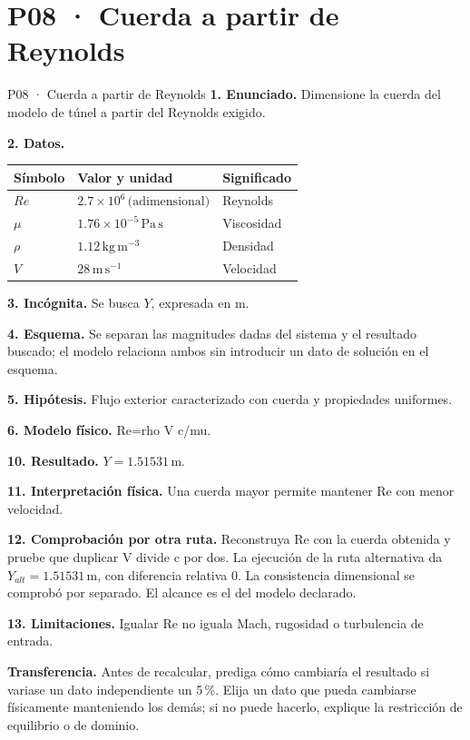 \chapter*{P08 · Cuerda a partir de Reynolds}
\begin{studiumworked}{P08 · Cuerda a partir de Reynolds}
\textbf{1. Enunciado.} Dimensione la cuerda del modelo de túnel a partir del Reynolds exigido.

\textbf{2. Datos.}
\begin{longtable}{p{.16\linewidth}p{.35\linewidth}p{.38\linewidth}}\toprule Símbolo & Valor y unidad & Significado\\\midrule\endhead
$Re$ & $2.7\times10^{6}\,\text{(adimensional)}$ & Reynolds\\
$\mu$ & $1.76\times10^{-5}\,\mathrm{Pa\,s}$ & Viscosidad\\
$\rho$ & $1.12\,\mathrm{kg\,m^{-3}}$ & Densidad\\
$V$ & $28\,\mathrm{m\,s^{-1}}$ & Velocidad\\
\bottomrule\end{longtable}
\textbf{3. Incógnita.} Se busca $Y$, expresada en $\mathrm m$.

\textbf{4. Esquema.} Se separan las magnitudes dadas del sistema y el resultado buscado; el modelo relaciona ambos sin introducir un dato de solución en el esquema.

\textbf{5. Hipótesis.} Flujo exterior caracterizado con cuerda y propiedades uniformes.

\textbf{6. Modelo físico.} Re=rho V c/mu.


\textbf{10. Resultado.} $Y=1.51531\,\mathrm m$.

\textbf{11. Interpretación física.} Una cuerda mayor permite mantener Re con menor velocidad.

\textbf{12. Comprobación por otra ruta.} Reconstruya Re con la cuerda obtenida y pruebe que duplicar V divide c por dos. La ejecución de la ruta alternativa da $Y_{alt}=1.51531\,\mathrm m$, con diferencia relativa $0$. La consistencia dimensional se comprobó por separado. El alcance es el del modelo declarado.

\textbf{13. Limitaciones.} Igualar Re no iguala Mach, rugosidad o turbulencia de entrada.

\textbf{Transferencia.} Antes de recalcular, prediga cómo cambiaría el resultado si variase un dato independiente un 5\,\%. Elija un dato que pueda cambiarse físicamente manteniendo los demás; si no puede hacerlo, explique la restricción de equilibrio o de dominio.\par
\end{studiumworked}
